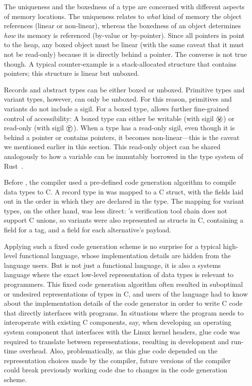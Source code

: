 The uniqueness and the boxedness of a type are concerned with different
aspects of memory locations.  The uniqueness relates to \emph{what} kind
of memory the object references (linear or non-linear), whereas the
boxedness of an object determines \emph{how} its memory is referenced
(by-value or by-pointer).
%
Since all pointers in \cogent point to the heap, any boxed object must
be linear (with the same caveat that it must not be read-only) because
it is directly behind a pointer. The converse is not true though. A
typical counter-example is a stack-allocated structure that contains
pointers; this structure is linear but unboxed.

Records and abstract types can be either boxed or unboxed. Primitive types and
variant types, however, can only be unboxed. For this reason, primitives and
variants do not include a sigil. For a boxed type, \cogent allows further
fine-grained control of accessibility: A boxed type can either be writable
(with sigil $\text{\textcircled{\texttt{w}}}$) or read-only (with sigil $\text{\textcircled{\texttt{r}}}$). When a type
has a read-only sigil, even though it is behind a pointer or contains pointers,
it becomes non-linear---this is the caveat we mentioned earlier in this section.
This read-only object can be shared analogously to how a variable can be immutably borrowed
in the type system of Rust~\citep[\S~4.2]{rust-borrow}.

Before \dargent{}, the \cogent compiler used a pre-defined code generation algorithm to compile
data types to C.
A record type in \cogent was mapped to a C
struct, with the fields laid out in the order in which they are declared in the
type. The mapping for variant types, on the other hand, was less direct:
\Cogent's verification tool chain does not support C unions, so variants were also represented as structs in C, containing a field for a tag, and a field for each alternative's payload.

Applying such a fixed code generation scheme is no surprise for a typical high-level
functional language,
whose implementation details are hidden from the language users. But \cogent is not just a functional language, it is also a systems language where
the exact low-level representation of data types is relevant to programmers.
This fixed code generation algorithm often resulted in
suboptimal or undesired representations of \cogent types in C, and users of the 
\cogent language had to know
about the implementation details of the code generator in order to write
C code that directly interfaces with \cogent programs. In situations where
the \cogent program needs to interoperate with existing C components, say,
when developing an operating system component that interfaces with the Linux
kernel headers, glue code was required to translate between representations, resulting in development
and run-time overhead. 
%
Also, problematically, as this glue code depended on the representation choices
made by the \cogent compiler, future versions of the compiler could break
previously working code due to changes in the code generation scheme.

